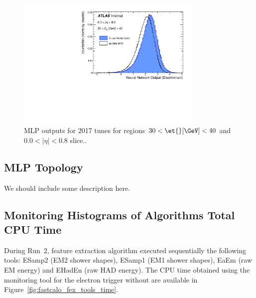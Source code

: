 \begin{figure}[ht]
  \centering
\includegraphics[width=0.8\textwidth]{appendices/figures/nn_output_mc15_versus_data16_et2_eta0.pdf}
\caption{MLP outputs for 2017 \rnn{} tunes for 
regions $30 < \et{} [\GeV] < 40$ and $0.0 < |\eta| < 0.8$ slice.\label{fig:mcdata_nnoutput}.}
\end{figure}


\subsection{MLP Topology}
\label{ssec:mlp_topo}

We should include some description here.






\subsection{Monitoring Histograms of \fastcalo Algorithms Total CPU
Time}\label{ssec:fastcalo_monitoring}

During Run~2, \fastcalo feature extraction algorithm executed sequentially the
following tools: ESamp2 (EM2 shower shapes), ESamp1 (EM1 shower shapes), EaEm
(raw EM energy) and EHadEn (raw HAD energy). The CPU time obtained using the
monitoring tool for the electron trigger without \rnn are available in
Figure~\ref{fig:fastcalo_fex_tools_time}.

